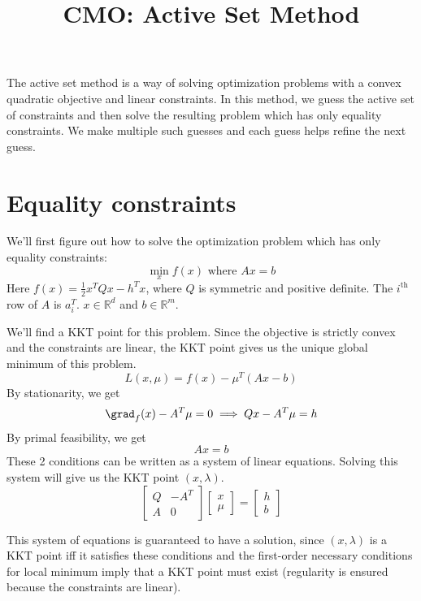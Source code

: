 
\usepackage{algorithm}
\usepackage{algpseudocode}

\newcommand\numberthis{\addtocounter{equation}{1}\tag{\theequation}}
\DeclareMathOperator*{\argminset}{argminset}

\title{CMO: Active Set Method}



\maketitle
\initMinimal{}

The active set method is a way of solving optimization problems with a convex quadratic objective
and linear constraints. In this method, we guess the active set of constraints and then solve
the resulting problem which has only equality constraints. We make multiple such guesses
and each guess helps refine the next guess.

\section{Equality constraints}

We'll first figure out how to solve the optimization problem
which has only equality constraints:
\[ \min_x f(x) \textrm{ where } Ax = b \]
Here $f(x) = \frac{1}{2} x^TQx - h^Tx$, where $Q$ is symmetric and positive definite.
The $i^{\textrm{th}}$ row of $A$ is $a_i^T$.
$x \in \mathbb{R}^d$ and $b \in \mathbb{R}^m$.

We'll find a KKT point for this problem.
Since the objective is strictly convex and the constraints are linear,
the KKT point gives us the unique global minimum of this problem.
\[ L(x, \mu) = f(x) - \mu^T(Ax - b) \]
By stationarity, we get
\[ \grad_f(x) - A^T\mu = 0 \implies Qx - A^T\mu = h \]
By primal feasibility, we get
\[ Ax = b \]
These 2 conditions can be written as a system of linear equations.
Solving this system will give us the KKT point $(x, \lambda)$.
\[ \begin{bmatrix} Q & -A^T \\ A & 0 \end{bmatrix}
\begin{bmatrix} x \\ \mu \end{bmatrix}
= \begin{bmatrix} h \\ b \end{bmatrix} \]

This system of equations is guaranteed to have a solution,
since $(x, \lambda)$ is a KKT point iff it satisfies these conditions
and the first-order necessary conditions for local minimum imply that a KKT point must exist
(regularity is ensured because the constraints are linear).

